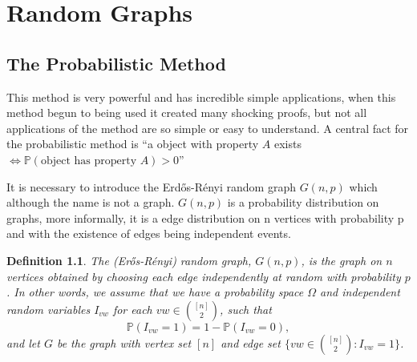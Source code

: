 \documentclass[12pt,twoside,a4paper]{book}
\numberwithin{equation}{section}
\newtheorem{theorem}             {Theorem}[section]
\newtheorem{definition}	[theorem] {Definition}
\theoremstyle{remark}
\begin{document}







\chapter{Random Graphs}
\section{The Probabilistic Method}
This method is very powerful and has incredible simple applications, when this method begun to being used it created many shocking proofs, but not all applications of the method are so simple or easy to understand. A central fact for the probabilistic method is ``a object with property $ A$ exists $\iff  \mathbb{P}(\text{object has property }A)>0$''

It is necessary to introduce the Erd\H{o}s-Rényi random graph $G(n,p)$ which although the name is not a graph. $G(n,p)$ is a probability distribution on graphs, more informally, it is a edge distribution on n vertices with probability p and with the existence of edges being independent events.

\begin{definition}\label{def:randomgraph}
The (Er\H{o}s-Rényi) random graph, $G(n,p)$, is the graph on $n$ vertices obtained by choosing each edge independently at random with probability $p$. In other words, we assume that we have a probability space $\Omega$ and independent random variables $I_{vw}$ for each $vw \in \binom{[n]}{2}$, such that
$$\mathbb{P}(I_{vw} = 1) = 1 - \mathbb{P}(I_{vw} = 0),$$ 
and let $G$ be the graph with vertex set $[n]$ and edge set $\{vw \in \binom{[n]}{2}: I_{vw} = 1\}$. 

\end{definition}
\end{document}
